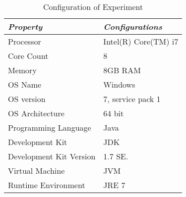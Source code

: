 %
%
\begin{table}
\centering

\begin{tabular}{|l|l|}
\hline 
	\emph{Property}&\emph{Configurations}\\ \hline

	Processor		& Intel(R) Core(TM) i7\\ \hline
	Core Count		& 8\\\hline
	Memory			& 8GB RAM \\\hline
	OS Name& Windows\\ \hline
	OS version & 7, service pack 1 \\ \hline
	OS Architecture & 64 bit\\ \hline
	Programming Language & Java\\ \hline
	Development Kit & JDK\\ \hline
	Development Kit Version & 1.7 SE.\\\hline
	Virtual Machine & JVM\\ \hline
	Runtime Environment & JRE 7\\\hline
	\end{tabular}
\caption{Configuration of Experiment}
\label{table:experiment_configuration}
\end{table}
%
